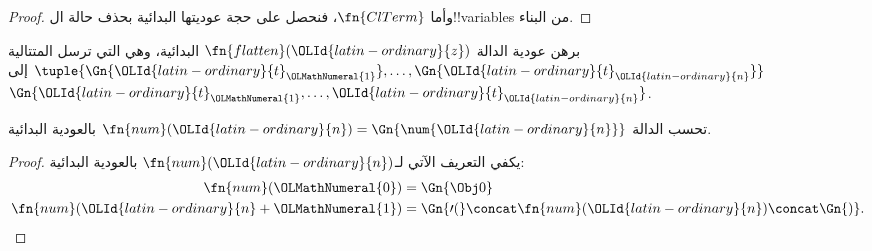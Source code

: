 \documentclass[../../../include/open-logic-section]{subfiles}
\begin{document}
\begin{proof}
وأما $\fn{ClTerm}$، فنحصل على حجة عوديتها
البدائية بحذف حالة ال!!{variable}s من البناء.
\end{proof}

\begin{prob}
برهن عودية الدالة $\fn{flatten}(\OLId{latin-ordinary}{z})$ البدائية، وهي التي ترسل المتتالية
$\tuple{\Gn{\OLId{latin-ordinary}{t}_\OLMathNumeral{1}}, \dots, \Gn{\OLId{latin-ordinary}{t}_\OLId{latin-ordinary}{n}}}$ إلى $\Gn{\OLId{latin-ordinary}{t}_\OLMathNumeral{1}, \dots, \OLId{latin-ordinary}{t}_\OLId{latin-ordinary}{n}}$.
\end{prob}

\begin{prop}
  تحسب الدالة $\fn{num}(\OLId{latin-ordinary}{n})=\Gn{\num{\OLId{latin-ordinary}{n}}}$ بالعودية البدائية.
\end{prop}

\begin{proof}
  يكفي التعريف الآتي لـ$\fn{num}(\OLId{latin-ordinary}{n})$ بالعودية البدائية:
  \begin{align*}
    \fn{num}(\OLMathNumeral{0}) & = \Gn{\Obj 0}\\
    \fn{num}(\OLId{latin-ordinary}{n}+\OLMathNumeral{1}) & = \Gn{\prime(} \concat \fn{num}(\OLId{latin-ordinary}{n}) \concat \Gn{)}.
  \end{align*}
\end{proof}
\end{document}
